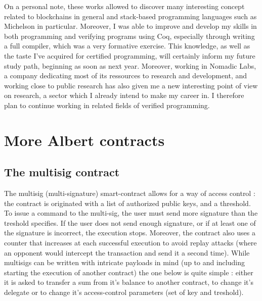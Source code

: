 \documentclass{report}
\begin{document}
On a personal note, these works allowed to discover many interesting concept related to blockchains in general and stack-based programming languages such as Michelson in particular. Moreover, I was able to improve and develop my skills in both programming and verifying programs using Coq, especially through writing a full compiler, which was a very formative exercise. This knowledge, as well as the taste I've acquired for certified programming, will certainly inform my future study path, beginning as soon as next year. Moreover, working in Nomadic Labs, a company dedicating most of its ressources to research and development, and working close to public research has also given me a new interesting point of view on research, a sector which I already intend to make my career in. I therefore plan to continue working in related fields of verified programming.

\appendix

\chapter{More Albert contracts}

\section{The multisig contract}
\label{appendix:multisigAlbert}

The multisig (multi-signature) smart-contract allows for a way of access control : the contract is originated with a list of authorized public keys, and a threshold. To issue a command to the multi-sig, the user must send more signature than the treshold specifies. If the user does not send enough signature, or if at least one of the signature is incorrect, the execution stops. Moreover, the contract also uses a counter that increases at each successful execution to avoid replay attacks (where an opponent would intercept the transaction and send it a second time). While multisigs can be written with intricate payloads in mind (up to and including starting the execution of another contract) the one below is quite simple : either it is asked to transfer a sum from it's balance to another contract, to change it's delegate or to change it's access-control parameters (set of key and treshold).
\end{document}
